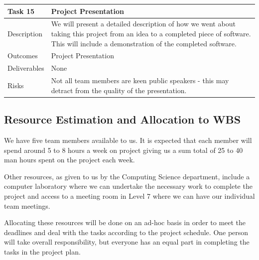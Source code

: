 \documentclass{l3proj}
\begin{document}
\begin{center}
    \begin{tabular}{ | l | p{12cm} |}
    \hline	
    Task 15 & Project Presentation \\ \hline
    Description & We will present a detailed description of how we went about taking this project from an idea to a completed piece of software. This will include a demonstration of the completed software. \\ \hline   
    Outcomes & Project Presentation \\ \hline
    Deliverables & None \\ \hline
    Risks & Not all team members are keen public speakers - this may detract from the quality of the presentation. \\ 
    \hline
    \end{tabular}
\end{center}

\subsection{Resource Estimation and Allocation to WBS}
We have five team members available to us. It is expected that each member will spend around 5 to 8 hours a week on project giving us a sum total of 25 to 40 man hours spent on the project each week.

Other resources, as given to us by the Computing Science department, include a
computer laboratory where we can undertake the necessary work to complete the
project and access to a meeting room in Level 7 where we can have our
individual team meetings.

Allocating these resources will be done on an ad-hoc basis in order to meet the deadlines and deal with the tasks according to the project schedule.
One person will take overall responsibility, but everyone has an equal part in completing the tasks in the project plan.
\end{document}
